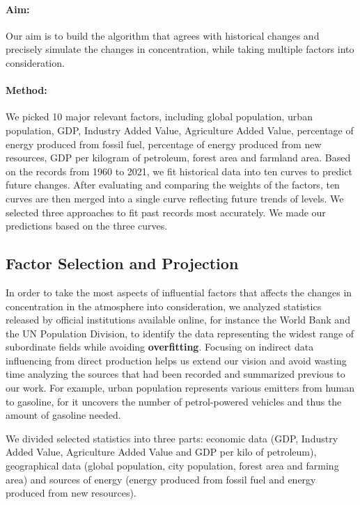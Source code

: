 \documentclass[12pt]{article}
\begin{document}
\paragraph{Aim:} 
Our aim is to build the algorithm that agrees with historical changes and precisely simulate the changes in  concentration, while taking multiple factors into consideration.

\paragraph{Method:}
We picked 10 major relevant factors, including global population, urban population, GDP, Industry Added Value, Agriculture Added Value, percentage of energy produced from fossil fuel, percentage of energy produced from new resources, GDP per kilogram of petroleum, forest area and farmland area. Based on the records from 1960 to 2021, we fit historical data into ten curves to predict future changes. After evaluating and comparing the weights of the factors, ten curves are then merged into a single curve reflecting future trends of  levels. We selected three approaches to fit past records most accurately. We made our predictions based on the three curves. 

\subsection{Factor Selection and Projection}
\label{factors}

In order to take the most aspects of influential factors that affects the changes in  concentration in the atmosphere into consideration, we analyzed statistics released by official institutions available online, for instance the World Bank and the UN Population Division, to identify the data representing the widest range of subordinate fields while avoiding \textbf{overfitting}. Focusing on indirect data influencing from direct  production helps us extend our vision and avoid wasting time analyzing the sources that had been recorded and summarized previous to our work. For example, urban population represents various  emitters from human to gasoline, for it uncovers the number of petrol-powered vehicles and thus the amount of gasoline needed. 

We divided selected statistics into three parts: economic data (GDP, Industry Added Value, Agriculture Added Value and GDP per kilo of petroleum), geographical data (global population, city population, forest area and farming area) and sources of energy (energy produced from fossil fuel and energy produced from new resources). 
\end{document}
